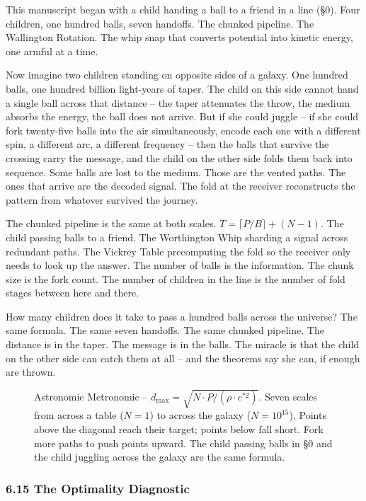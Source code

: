 \documentclass[
  11pt,
]{article}
\begin{document}
This manuscript began with a child handing a ball to a friend in a line
(§0). Four children, one hundred balls, seven handoffs. The chunked
pipeline. The Wallington Rotation. The whip snap that converts potential
into kinetic energy, one armful at a time.

Now imagine two children standing on opposite sides of a galaxy. One
hundred balls, one hundred billion light-years of taper. The child on
this side cannot hand a single ball across that distance -- the taper
attenuates the throw, the medium absorbs the energy, the ball does not
arrive. But if she could juggle -- if she could fork twenty-five balls
into the air simultaneously, encode each one with a different spin, a
different arc, a different frequency -- then the balls that survive the
crossing carry the message, and the child on the other side folds them
back into sequence. Some balls are lost to the medium. Those are the
vented paths. The ones that arrive are the decoded signal. The fold at
the receiver reconstructs the pattern from whatever survived the
journey.

The chunked pipeline is the same at both scales.
\(T = \lceil P/B \rceil + (N - 1)\). The child passing balls to a
friend. The Worthington Whip sharding a signal across redundant paths.
The Vickrey Table precomputing the fold so the receiver only needs to
look up the answer. The number of balls is the information. The chunk
size is the fork count. The number of children in the line is the number
of fold stages between here and there.

How many children does it take to pass a hundred balls across the
universe? The same formula. The same seven handoffs. The same chunked
pipeline. The distance is in the taper. The message is in the balls. The
miracle is that the child on the other side can catch them at all -- and
the theorems say she can, if enough are thrown.

\begin{figure}[ht]
\centering

\caption{Astronomic Metronomic -- $d_{\max} = \sqrt{N \cdot P / (\rho \cdot c^{*2})}$. Seven scales from across a table ($N=1$) to across the galaxy ($N=10^{15}$). Points above the diagonal reach their target; points below fall short. Fork more paths to push points upward. The child passing balls in \S0 and the child juggling across the galaxy are the same formula.}
\label{fig:astronomic-metronomic}
\end{figure}

\subsubsection{6.15 The Optimality
Diagnostic}\label{the-optimality-diagnostic}
\end{document}
